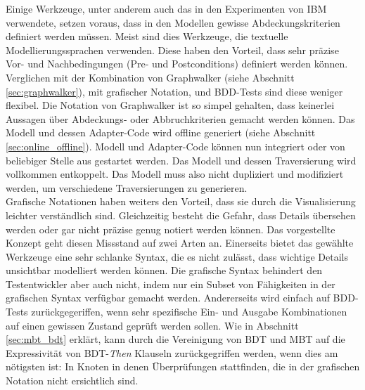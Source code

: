 Einige Werkzeuge, unter anderem auch das in den Experimenten von IBM \cite{farchi_using_2002} verwendete, setzen voraus, dass in den Modellen gewisse Abdeckungskriterien definiert werden müssen. Meist sind dies Werkzeuge, die textuelle Modellierungssprachen verwenden. Diese haben den Vorteil, dass sehr präzise Vor- und Nachbedingungen (Pre- und Postconditions) definiert werden können. Verglichen mit der Kombination von Graphwalker (siehe Abschnitt \ref{sec:graphwalker}), mit grafischer Notation, und BDD-Tests sind diese weniger flexibel. Die Notation von Graphwalker ist so simpel gehalten, dass keinerlei Aussagen über Abdeckungs- oder Abbruchkriterien gemacht werden können. Das Modell und dessen Adapter-Code wird offline generiert (siehe Abschnitt  \ref{sec:online_offline}). Modell und Adapter-Code können nun integriert oder von beliebiger Stelle aus gestartet werden. Das Modell und dessen Traversierung wird vollkommen entkoppelt. Das Modell muss also nicht dupliziert und modifiziert werden, um verschiedene Traversierungen zu generieren.\\
Grafische Notationen haben weiters den Vorteil, dass sie durch die Visualisierung leichter verständlich sind. Gleichzeitig besteht die Gefahr, dass Details übersehen werden oder gar nicht präzise genug notiert werden können. Das vorgestellte Konzept geht diesen Missstand auf zwei Arten an. Einerseits bietet das gewählte Werkzeuge eine sehr schlanke Syntax, die es nicht zulässt, dass wichtige Details unsichtbar modelliert werden können. Die grafische Syntax behindert den Testentwickler aber auch nicht, indem nur ein Subset von Fähigkeiten in der grafischen Syntax verfügbar gemacht werden. Andererseits wird einfach auf BDD-Tests zurückgegeriffen, wenn sehr spezifische Ein- und Ausgabe Kombinationen auf einen gewissen Zustand geprüft werden sollen. Wie in Abschnitt \ref{sec:mbt_bdt} erklärt, kann durch die Vereinigung von \Gls{BDT} und \Gls{MBT} auf die Expressivität von \Gls{BDT}-\textit{Then} Klauseln zurückgegriffen werden, wenn dies am nötigsten ist: In Knoten in denen Überprüfungen stattfinden, die in der grafischen Notation nicht ersichtlich sind.\\
